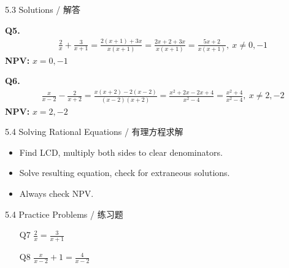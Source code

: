 \documentclass[aspectratio=169]{beamer}
\begin{document}
\begin{frame}{5.3 Solutions / 解答}
    \begin{tcolorbox}[colback=lightgray,colframe=primary,title=Solutions]
        \footnotesize
        \textbf{Q5.}
        \begin{align*}
            &\frac{2}{x} + \frac{3}{x+1} = \frac{2(x+1)+3x}{x(x+1)} = \frac{2x+2+3x}{x(x+1)} = \frac{5x+2}{x(x+1)},\ x\neq0,-1
        \end{align*}
        \textbf{NPV:} $x=0,-1$
        
        \textbf{Q6.}
        \begin{align*}
            &\frac{x}{x-2} - \frac{2}{x+2} = \frac{x(x+2)-2(x-2)}{(x-2)(x+2)} = \frac{x^2+2x-2x+4}{x^2-4} = \frac{x^2+4}{x^2-4},\ x\neq2,-2
        \end{align*}
        \textbf{NPV:} $x=2,-2$
    \end{tcolorbox}
\end{frame}

\begin{frame}{5.4 Solving Rational Equations / 有理方程求解}
    \begin{tcolorbox}[colback=lightgray,colframe=primary,title=Key Points / 重点]
        \footnotesize
        \begin{itemize}
            \item Find LCD, multiply both sides to clear denominators.
            \item Solve resulting equation, check for extraneous solutions.
            \item Always check NPV.
        \end{itemize}
    \end{tcolorbox}
\end{frame}

\begin{frame}{5.4 Practice Problems / 练习题}
    \begin{tcolorbox}[colback=lightgray,colframe=accent,title=Practice]
        \footnotesize
        \begin{enumerate}
            \item[Q7] $\frac{2}{x} = \frac{3}{x+1}$
            \item[Q8] $\frac{x}{x-2} + 1 = \frac{4}{x-2}$
        \end{enumerate}
    \end{tcolorbox}
\end{frame}
\end{document}
